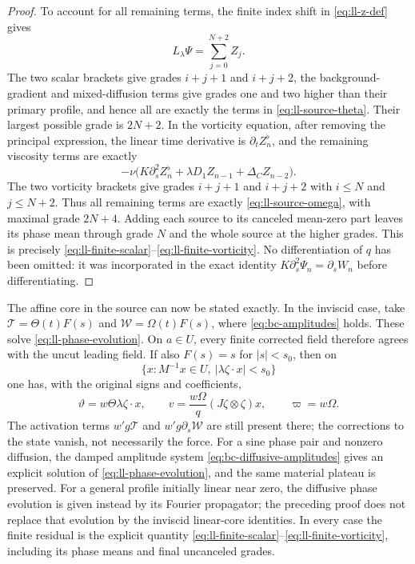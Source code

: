 \begin{proof}
To account for all remaining terms, the finite index shift in
\eqref{eq:ll-z-def} gives
\[
L_\lambda\Psi=\sum_{j=0}^{N+2}Z_j.
\]
The two scalar brackets give grades $i+j+1$ and $i+j+2$,
the background-gradient and mixed-diffusion terms give grades one
and two higher than their primary profile, and hence all are
exactly the terms in \eqref{eq:ll-source-theta}.
Their largest possible grade is $2N+2$.
In the vorticity equation, after removing the principal expression,
the linear time derivative is $\partial_tZ_n^\flat$, and the
remaining viscosity terms are exactly
\[
-\nu\bigl(K\partial_s^2Z_n^\flat
                  +\lambda D_1Z_{n-1}+\Delta_CZ_{n-2}\bigr).
\]
The two vorticity brackets give grades $i+j+1$ and $i+j+2$ with
$i\leq N$ and $j\leq N+2$. Thus all remaining terms are exactly
\eqref{eq:ll-source-omega}, with maximal grade $2N+4$.
Adding each source to its canceled mean-zero part leaves its phase
mean through grade $N$ and the whole source at the higher grades.
This is precisely \eqref{eq:ll-finite-scalar}--\eqref{eq:ll-finite-vorticity}.
No differentiation of $q$ has been omitted: it was incorporated in
the exact identity $K\partial_s^2\Psi_n=\partial_sW_n$ before
differentiating.
\end{proof}

The affine core in the source can now be stated exactly. In the
inviscid case, take
$\mathcal T=\Theta(t)F(s)$ and $\mathcal W=\Omega(t)F(s)$,
where \eqref{eq:bc-amplitudes} holds. These solve
\eqref{eq:ll-phase-evolution}. On $a\in U$, every finite corrected
field therefore agrees with the uncut leading field. If also
$F(s)=s$ for $|s|<s_0$, then on
\[
\{x:M^{-1}x\in U,\ |\lambda\zeta\cdot x|<s_0\}
\]
one has, with the original signs and coefficients,
\[
\vartheta=w\Theta\lambda\zeta\cdot x,\qquad
v=\frac{w\Omega}{q}(J\zeta\otimes\zeta)x,\qquad
\varpi=w\Omega.
\]
The activation terms $w'g\mathcal T$ and
$w'g\partial_s\mathcal W$ are still present there; the corrections
to the state vanish, not necessarily the force.
For a sine phase pair and nonzero diffusion, the damped amplitude
system \eqref{eq:bc-diffusive-amplitudes} gives an explicit solution
of \eqref{eq:ll-phase-evolution}, and the same material plateau is
preserved. For a general profile initially linear near zero, the
diffusive phase evolution is given instead by its Fourier propagator;
the preceding proof does not replace that evolution by the inviscid
linear-core identities. In every case the finite residual is the
explicit quantity \eqref{eq:ll-finite-scalar}--\eqref{eq:ll-finite-vorticity},
including its phase means and final uncanceled grades.
